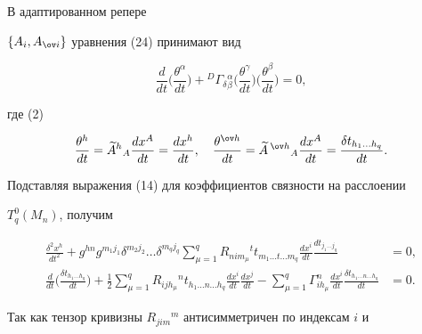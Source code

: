 В адаптированном репере


$\{A_i,A_{\ov i}\}$ уравнения (24) принимают вид


$$


\frac{d}{dt}\bigg(\frac{\theta^\alpha}{dt} \bigg)+


{}^{D}\varGamma_{\delta}{}^\alpha_\beta


\bigg(\frac{\theta^\gamma}{dt} \bigg)


\bigg(\frac{\theta^\beta}{dt} \bigg)=0,


$$


где (2)


$$


\frac{\theta^h}{dt}={\widetilde A}^{h}{}_A


\frac{dx^A}{dt}=\frac{dx^h}{dt}, \quad


\frac{\theta^{\ov h}}{dt}=


{\widetilde A}\,^{\ov h}{}_A\frac{dx^A}{dt}=


\frac{\delta t_{h_1\dotsc h_q}}{dt}.


$$


Подставляя выражения (14) для коэффициентов связности на расслоении


$T^0_q(M_n)$, получим


\begin{equation}


\begin{split}


\frac{\delta^2x^h}{dt^2}+g^{hn}g^{m_1j_1}\delta^{m_2j_2}\dotsc


\delta^{m_q j_q}\sum\limits^q_{\mu=1}R_{nim_\mu}{}^t


t_{m_1\dotsc t\dotsc m_q}\frac{dx^i}{dt}


\frac{dt_{j_1\dotsc j_q}}{}&=0,\\


\frac{d}{dt}\big(\frac{\delta t_{h_1\dotsc h_q}}{dt}\big)


+\frac{1}{2}\sum\limits^q_{\mu=1}R_{ijh_\mu}{}^n


t_{h_1\dotsc n\dotsc h_q}\frac{dx^i}{dt}\frac{dx^j}{dt}


-\sum\limits^q_{\mu=1}\Gamma^n_{ih_\mu}


\frac{dx^i}{dt}\frac{\delta t_{h_1\dotsc n\dotsc h_q}}{dt}&=0.


\end{split}


\end{equation}


Так как тензор кривизны $R_{jim}{}^m$ антисимметричен по индексам $i$ и



